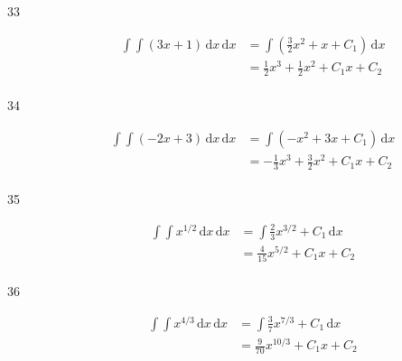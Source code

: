 \documentclass{exam}
\begin{document}
\begin{description}
\item[33]
\begin{align*}
  \int \int \left( 3x + 1 \right) \, \mathrm{d}x \, \mathrm{d}x &= \int \left( \frac{3}{2} x^2 + x + C_1 \right) \, \mathrm{d}x \\
  &= \frac{1}{2} x^3 + \frac{1}{2} x^2 + C_1 x + C_2 \\
\end{align*}

\item[34]
\begin{align*}
  \int \int \left( -2x + 3 \right) \, \mathrm{d}x \, \mathrm{d}x &= \int \left( -x^2 + 3x + C_1 \right) \, \mathrm{d}x \\
  &= - \frac{1}{3} x^3 + \frac{3}{2} x^2 + C_1 x + C_2 \\
\end{align*}

\item[35]
\begin{align*}
  \int \int x^{1/2} \, \mathrm{d}x \, \mathrm{d}x &= \int \frac{2}{3} x^{3/2} + C_1 \, \mathrm{d}x \\
  &= \frac{4}{15} x^{5/2} + C_1 x + C_2 \\
\end{align*}

\item[36]
\begin{align*}
  \int \int x^{4/3} \, \mathrm{d}x \, \mathrm{d}x &= \int \frac{3}{7} x^{7/3} + C_1 \, \mathrm{d}x \\
  &= \frac{9}{70} x^{10/3} + C_1 x + C_2 \\
\end{align*}


\end{description}

\else

\vspace{9 cm}
\end{document}
